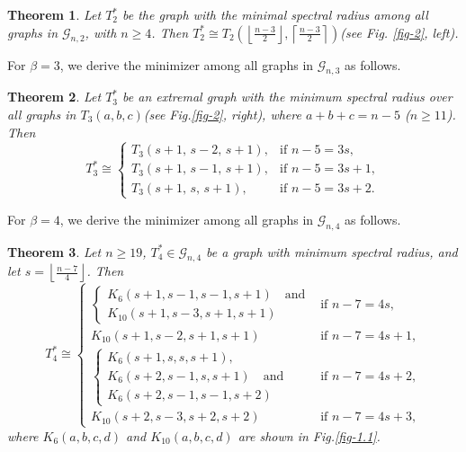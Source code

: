 \documentclass[12pt]{amsart}
\newtheorem{thm}{Theorem}[section]
\begin{document}
\begin{thm}\label{thm-1.1}
Let \( T_2^* \) be the graph with the minimal spectral radius among all graphs in \( \mathcal{G}_{n,2} \),  with $n\geq 4$. Then \( T_2^* \cong T_2\left( \left\lfloor \tfrac{n-3}{2} \right\rfloor, \left\lceil \tfrac{n-3}{2} \right\rceil \right) \)(see Fig. \ref{fig-2}, left).
\end{thm}

For \( \beta = 3 \), we derive the minimizer among all graphs in \( \mathcal{G}_{n,3} \) as follows.

\begin{thm}\label{matching3-min}
Let \( T_3^* \) be an extremal graph with the minimum spectral radius over all graphs in \( T_3(a,b,c) \)(see Fig.\ref{fig-2}, right), where \( a + b + c = n - 5 \) (\( n \geq 11 \)). Then
\[
T_3^* \cong 
\begin{cases}
T_3\!\left( s+1, \, s-2, \, s+1 \right), & \text{if } n-5=3s, \\
T_3\!\left( s+1, \, s-1, \, s+1 \right), & \text{if } n-5=3s+1, \\
T_3\!\left( s+1, \, s, \, s+1 \right), & \text{if } n-5=3s+2.
\end{cases}
\]
\end{thm}

For \( \beta = 4 \), we derive the minimizer among all graphs in \( \mathcal{G}_{n,4} \) as follows.

\begin{thm}\label{thm-1.3}
Let \( n \geq 19 \), \( T_4^* \in \mathcal{G}_{n,4} \) be a graph with minimum spectral radius, and let \( s = \left\lfloor \frac{n - 7}{4} \right\rfloor \). Then
\[
T_4^* \cong \begin{cases} 
\begin{cases} K_6(s + 1, s - 1, s - 1, s + 1) \quad \text{and} \\ K_{10}(s + 1, s -3, s + 1, s +1) \end{cases} & \text{if } n - 7 = 4s, \\
K_{10}(s + 1, s - 2, s + 1, s + 1) & \text{if } n - 7 = 4s + 1, \\
\begin{cases} K_6(s + 1, s, s, s + 1), \\ K_6(s + 2, s - 1, s, s + 1) \quad \text{and} \\ K_6(s + 2, s - 1, s - 1, s + 2) \end{cases} & \text{if } n - 7 = 4s + 2, \\
K_{10}(s + 2, s - 3, s + 2, s + 2) & \text{if } n - 7 = 4s + 3,
\end{cases}
\]
where $K_6(a,b,c,d)$ and $K_{10}(a,b,c,d)$ are shown in Fig.\ref{fig-1.1}.
\end{thm}
\end{document}
